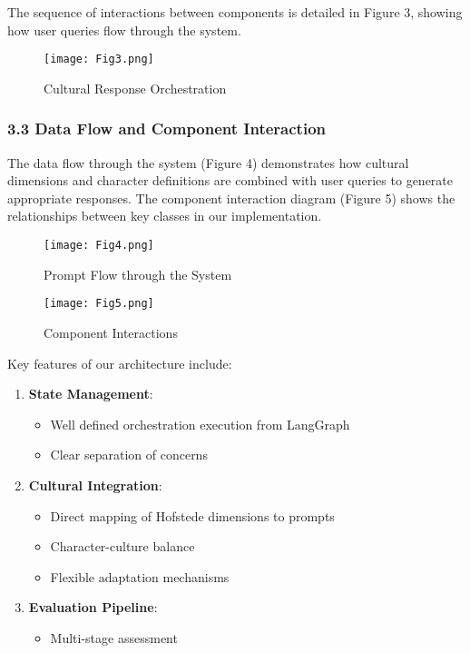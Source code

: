 \documentclass[
]{article}
\providecommand{\tightlist}{%
  \setlength{\itemsep}{0pt}\setlength{\parskip}{0pt}}
\begin{document}
The sequence of interactions between components is detailed in Figure 3,
showing how user queries flow through the system.

\begin{figure}
    \centering
    \texttt{[image: Fig3.png]}
    \caption{Cultural Response Orchestration}
    \label{fig:enter-label}
\end{figure}

\subsubsection{3.3 Data Flow and Component
Interaction}\label{data-flow-and-component-interaction}

The data flow through the system (Figure 4) demonstrates how cultural
dimensions and character definitions are combined with user queries to
generate appropriate responses. The component interaction diagram
(Figure 5) shows the relationships between key classes in our
implementation.

\begin{figure}
    \centering
    \texttt{[image: Fig4.png]}
    \caption{Prompt Flow through the System}
    \label{fig:enter-label}
\end{figure}

\begin{figure}
    \centering
    \texttt{[image: Fig5.png]}
    \caption{Component Interactions}
    \label{fig:enter-label}
\end{figure}

Key features of our architecture include:

\begin{enumerate}
\def\labelenumi{\arabic{enumi}.}
\tightlist
\item
  \textbf{State Management}:

  \begin{itemize}
  \tightlist
  \item
    Well defined orchestration execution from LangGraph
  \item
    Clear separation of concerns
  \end{itemize}
\item
  \textbf{Cultural Integration}:

  \begin{itemize}
  \tightlist
  \item
    Direct mapping of Hofstede dimensions to prompts
  \item
    Character-culture balance
  \item
    Flexible adaptation mechanisms
  \end{itemize}
\item
  \textbf{Evaluation Pipeline}:

  \begin{itemize}
  \tightlist
  \item
    Multi-stage assessment
  \end{itemize}
\end{enumerate}
\end{document}

